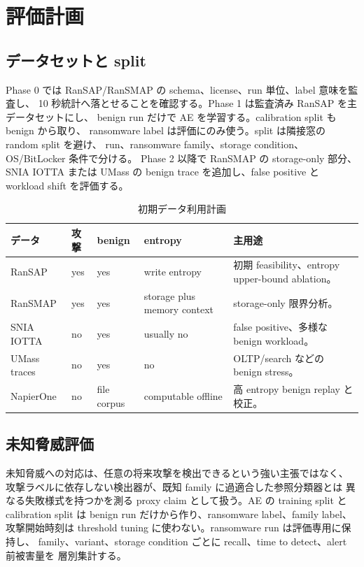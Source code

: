 \section{評価計画}

\subsection{データセットと split}

Phase 0 では RanSAP/RanSMAP の schema、license、run 単位、label 意味を監査し、
10 秒統計へ落とせることを確認する。Phase 1 は監査済み RanSAP を主データセットにし、
benign run だけで AE を学習する。calibration split も benign から取り、
ransomware label は評価にのみ使う。split は隣接窓の random split を避け、
run、ransomware family、storage condition、OS/BitLocker 条件で分ける。
Phase 2 以降で RanSMAP の storage-only 部分、SNIA IOTTA または UMass の
benign trace を追加し、false positive と workload shift を評価する。

\begin{table}[tb]
  \centering
  \caption{初期データ利用計画}
  \label{tab:dataset-plan}
  \begin{tabularx}{\linewidth}{lYYYY}
    \toprule
    データ & 攻撃 & benign & entropy & 主用途 \\
    \midrule
    RanSAP & yes & yes & write entropy & 初期 feasibility、entropy upper-bound ablation。 \\
    RanSMAP & yes & yes & storage plus memory context & storage-only 限界分析。 \\
    SNIA IOTTA & no & yes & usually no & false positive、多様な benign workload。 \\
    UMass traces & no & yes & no & OLTP/search などの benign stress。 \\
    NapierOne & no & file corpus & computable offline & 高 entropy benign replay と校正。 \\
    \bottomrule
  \end{tabularx}
\end{table}

\subsection{未知脅威評価}

未知脅威への対応は、任意の将来攻撃を検出できるという強い主張ではなく、
攻撃ラベルに依存しない検出器が、既知 family に過適合した参照分類器とは
異なる失敗様式を持つかを測る proxy claim として扱う。AE の training split と
calibration split は benign run だけから作り、ransomware label、family label、
攻撃開始時刻は threshold tuning に使わない。ransomware run は評価専用に保持し、
family、variant、storage condition ごとに recall、time to detect、alert 前被害量を
層別集計する。

